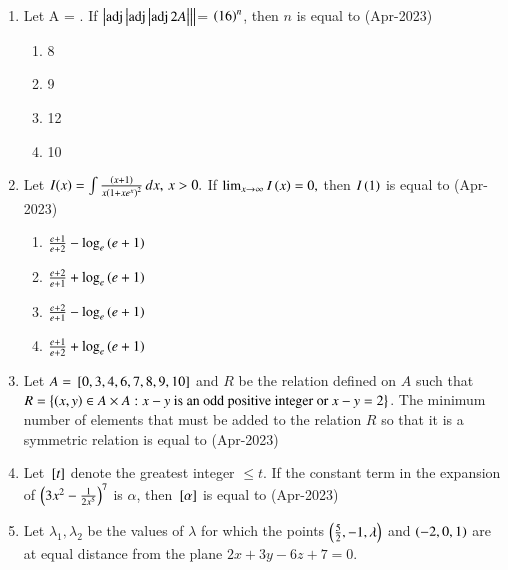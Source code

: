 \documentclass[journal]{IEEEtran}
\numberwithin{equation}{enumi}
\numberwithin{figure}{enumi}
\begin{document}
\begin{enumerate}
\begin{multicols}{4}
\begin{enumerate}
    \item 20
    \item 18
    \end{enumerate}
\end{multicols}
\item Let A =   . If  $\left\vert\operatorname{adj}\left\vert\operatorname{adj}\left\vert\operatorname{adj}2A\right\vert\right\vert\right\vert$= $\left(16\right)^n$, then $n$ is equal to
\hfill(Apr-2023)
\begin{multicols}{4}
    \begin{enumerate}
    \item 8
    \item 9
    \item 12
    \item 10
    \end{enumerate}
\end{multicols}
\item Let \( I(x) = \int \frac{\left(x+1\right)}{x\left(1 + x e^x\right)^2} \, dx, \, x > 0. \) If \( \lim_{x \to \infty} I\left(x\right) = 0, \) then \( I\left(1\right) \) is equal to
\hfill(Apr-2023)
\begin{multicols}{2}
    \begin{enumerate}
    \item  $\frac{e+1}{e+2} - \log_e\left(e+1\right) $
    \item  $\frac{e+2}{e+1} + \log_e\left(e+1\right)$ 
    \item  $\frac{e+2}{e+1} - \log_e\left(e+1\right) $
    \item  $\frac{e+1}{e+2} + \log_e\left(e+1\right) $
\end{enumerate}
\end{multicols}
\item   Let $A = {}\left[0, 3, 4, 6, 7, 8, 9, 10\right]$ and $R$ be the relation defined on $A$ such that $R = \left\{(x, y) \in A \times A : x - y \text{ is an odd positive integer or } x - y = 2 \right\}$. The minimum number of elements that must be added to the relation $R$ so that it is a symmetric relation is equal to 
\hfill(Apr-2023)
\item Let ${}\left[t\right]$ denote the greatest integer $\leq t$. If the constant term in the expansion of $\left(3x^2 - \frac{1}{2x^5}\right)^7$ is $\alpha$, then ${}\left[\alpha\right]$  is equal to 
\hfill(Apr-2023)
\item Let $\lambda_1, \lambda_2$ be the values of $\lambda$ for which the points 
$\left(\frac{5}{2}, -1, \lambda\right)$ and $\left(-2, 0, 1\right)$ 
are at equal distance from the plane $2x + 3y - 6z + 7 = 0$. 

\end{enumerate}
\end{document}

